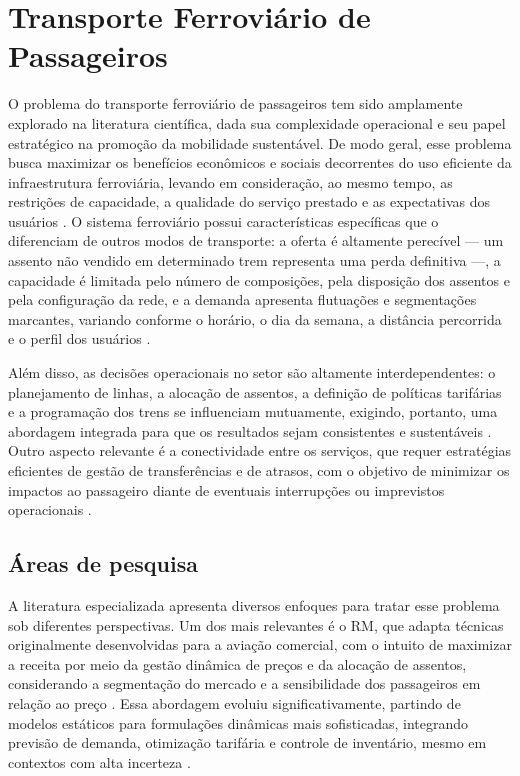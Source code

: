 \section{Transporte Ferroviário de Passageiros}
O problema do transporte ferroviário de passageiros tem sido amplamente explorado na literatura científica, dada sua complexidade operacional e seu papel estratégico na promoção da mobilidade sustentável. De modo geral, esse problema busca maximizar os benefícios econômicos e sociais decorrentes do uso eficiente da infraestrutura ferroviária, levando em consideração, ao mesmo tempo, as restrições de capacidade, a qualidade do serviço prestado e as expectativas dos usuários \citep{Huisman_2005, Shan2024}. O sistema ferroviário possui características específicas que o diferenciam de outros modos de transporte: a oferta é altamente perecível — um assento não vendido em determinado trem representa uma perda definitiva —, a capacidade é limitada pelo número de composições, pela disposição dos assentos e pela configuração da rede, e a demanda apresenta flutuações e segmentações marcantes, variando conforme o horário, o dia da semana, a distância percorrida e o perfil dos usuários \citep{Guan2023, Besinovic2022}.

Além disso, as decisões operacionais no setor são altamente interdependentes: o planejamento de linhas, a alocação de assentos, a definição de políticas tarifárias e a programação dos trens se influenciam mutuamente, exigindo, portanto, uma abordagem integrada para que os resultados sejam consistentes e sustentáveis \citep{Huisman_2005, Shan2024}. Outro aspecto relevante é a conectividade entre os serviços, que requer estratégias eficientes de gestão de transferências e de atrasos, com o objetivo de minimizar os impactos ao passageiro diante de eventuais interrupções ou imprevistos operacionais \citep{Konig2020}.

\subsection{Áreas de pesquisa}

A literatura especializada apresenta diversos enfoques para tratar esse problema sob diferentes perspectivas. Um dos mais relevantes é o RM, que adapta técnicas originalmente desenvolvidas para a aviação comercial, com o intuito de maximizar a receita por meio da gestão dinâmica de preços e da alocação de assentos, considerando a segmentação do mercado e a sensibilidade dos passageiros em relação ao preço \citep{Ammirato2020, Guan2023}. Essa abordagem evoluiu significativamente, partindo de modelos estáticos para formulações dinâmicas mais sofisticadas, integrando previsão de demanda, otimização tarifária e controle de inventário, mesmo em contextos com alta incerteza \citep{HETRAKUL201468, Shan2024}.


